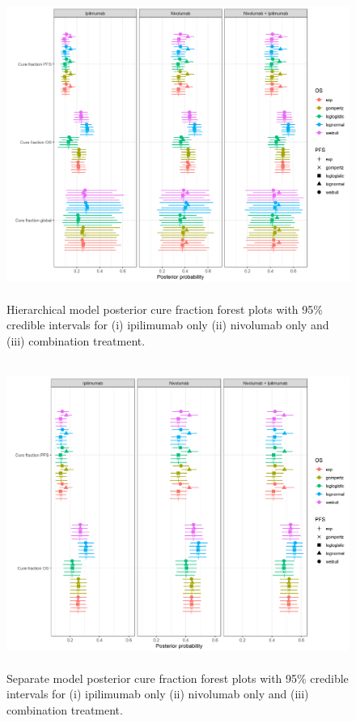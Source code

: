 \documentclass[AMA,STIX1COL]{WileyNJD-v2}
\begin{document}
\begin{figure}
\centering
\includegraphics[height=10cm, width=0.9\linewidth]{forest_plot_joint_cf_hier.png}
\caption{\label{fig:cf_forest_all_tx} Hierarchical model posterior cure fraction forest plots with 95\% credible intervals for (i) ipilimumab only (ii) nivolumab only and (iii) combination treatment.}
\end{figure}

\begin{figure}
\centering
\includegraphics[height=10cm, width=0.9\linewidth]{forest_plot_joint_all_tx_separate.png}
\caption{\label{fig:cf_forest_all_tx_sep} Separate model posterior cure fraction forest plots with 95\% credible intervals for (i) ipilimumab only (ii) nivolumab only and (iii) combination treatment.}
\end{figure}
\end{document}

